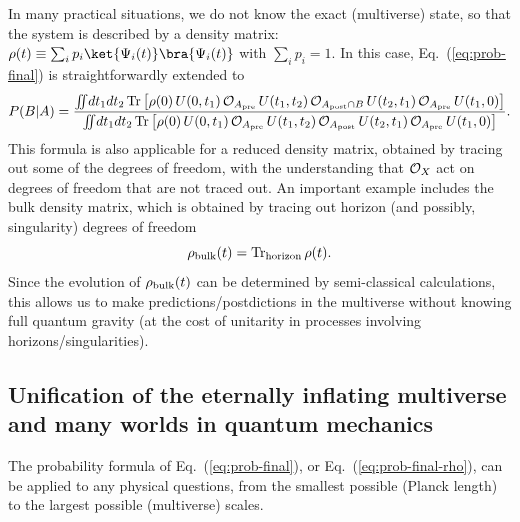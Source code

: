 \documentclass[12pt]{article}
\begin{document}
In many practical situations, we do not know the exact (multiverse) 
state, so that the system is described by a density matrix:\ $\rho(t) 
\equiv \sum_i p_i \ket{\Psi_i(t)} \bra{\Psi_i(t)}$ with $\sum_i p_i = 1$. 
In this case, Eq.~(\ref{eq:prob-final}) is straightforwardly extended to
%
\begin{equation}
  P(B|A) = \frac{\int\!\!\!\int\!dt_1 dt_2\, {\rm Tr}\left[ \rho(0)\, 
    U(0,t_1)\, {\cal O}_{A_{\rm pre}}\, U(t_1,t_2)\, 
    {\cal O}_{A_{\rm post} \cap B}\, U(t_2,t_1)\, {\cal O}_{A_{\rm pre}}\, 
    U(t_1,0) \right]}
  {\int\!\!\!\int\!dt_1 dt_2\, {\rm Tr}\left[ \rho(0)\, 
    U(0,t_1)\, {\cal O}_{A_{\rm pre}}\, U(t_1,t_2)\, 
    {\cal O}_{A_{\rm post}}\, U(t_2,t_1)\, {\cal O}_{A_{\rm pre}}\, 
    U(t_1,0) \right]}.
\label{eq:prob-final-rho}
\end{equation}
%
This formula is also applicable for a reduced density matrix, obtained 
by tracing out some of the degrees of freedom, with the understanding 
that ${\cal O}_X$ act on degrees of freedom that are not traced 
out.  An important example includes the bulk density matrix, which 
is obtained by tracing out horizon (and possibly, singularity) degrees 
of freedom~\cite{Nomura:2011dt}
%
\begin{equation}
  \rho_{\rm bulk}(t) = {\rm Tr}_{\rm horizon}\, \rho(t).
\label{eq:rho-red_bulk}
\end{equation}
%
Since the evolution of $\rho_{\rm bulk}(t)$ can be determined by 
semi-classical calculations, this allows us to make predictions/postdictions 
in the multiverse without knowing full quantum gravity (at the cost of 
unitarity in processes involving horizons/singularities).


\subsection{Unification of the eternally inflating multiverse and many 
 worlds in quantum mechanics}

The probability formula of Eq.~(\ref{eq:prob-final}), or 
Eq.~(\ref{eq:prob-final-rho}), can be applied to any physical 
questions, from the smallest possible (Planck length) to the largest 
possible (multiverse) scales.
\end{document}
